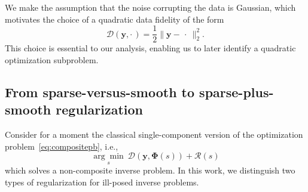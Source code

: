 \documentclass[12pt]{article}
\begin{document}
    We make the assumption that the noise corrupting the data is Gaussian, which motivates the choice of a quadratic data fidelity of the form
    \begin{equation*}
        \mathcal{D} (\bm{y}, \cdot\,) =  \frac{1}{2} \| \bm{y} - \, \cdot \ \|_2^2.
    \end{equation*}
    This choice is essential to our analysis, enabling us to later identify a quadratic optimization subproblem. 
    
    \subsection{From sparse-versus-smooth to sparse-plus-smooth regularization}
    \label{sec:regularizationblabla}

    Consider for a moment the classical single-component version of the optimization problem~\eqref{eq:compositepb}, i.e.,
    \begin{equation} \label{eq:singletpb}
        \underset{s}{\arg\min} \ \mathcal{D}(\bm{y}, \bm{\Phi}(s)) + \mathcal{R} (s)
    \end{equation}
    which solves a non-composite inverse problem. In this work, we distinguish two types of regularization for ill-posed inverse problems.
\end{document}
